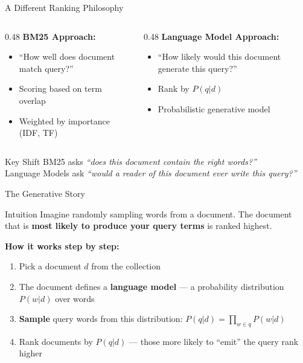 \documentclass[aspectratio=169]{beamer}
\newif\ifanimated
\newcommand{\cpause}{\ifanimated\pause\fi}
\begin{document}
\begin{frame}{A Different Ranking Philosophy}
\begin{columns}
\begin{column}{0.48\textwidth}
\textbf{BM25 Approach:}
\begin{itemize}
    \item ``How well does document match query?''
    \item Scoring based on term overlap
    \item Weighted by importance (IDF, TF)
\end{itemize}
\end{column}

\begin{column}{0.48\textwidth}
\textbf{Language Model Approach:}
\begin{itemize}
    \item ``How likely would this document generate this query?''
    \item Rank by $P(q|d)$
    \item Probabilistic generative model
\end{itemize}
\end{column}
\end{columns}

\vspace{1em}

\begin{exampleblock}{Key Shift}
BM25 asks \textit{``does this document contain the right words?''} \\
Language Models ask \textit{``would a reader of this document ever write this query?''}
\end{exampleblock}
\end{frame}


\begin{frame}{The Generative Story}
\begin{exampleblock}{Intuition}
Imagine randomly sampling words from a document. The document that is \textbf{most likely to produce your query terms} is ranked highest.
\end{exampleblock}

\vspace{1em}

\textbf{How it works step by step:}
\begin{enumerate}
    \item Pick a document $d$ from the collection\cpause
    \item The document defines a \textbf{language model} --- a probability distribution $P(w|d)$ over words\cpause
    \item \textbf{Sample} query words from this distribution: $P(q|d) = \prod_{w \in q} P(w|d)$\cpause
    \item Rank documents by $P(q|d)$ --- those more likely to ``emit'' the query rank higher\cpause
\end{enumerate}

\end{frame}
\end{document}
